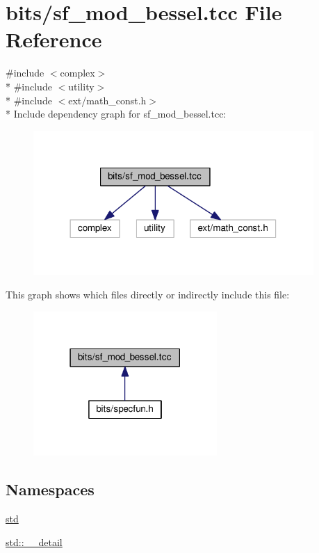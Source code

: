 \hypertarget{sf__mod__bessel_8tcc}{}\section{bits/sf\+\_\+mod\+\_\+bessel.tcc File Reference}
\label{sf__mod__bessel_8tcc}
{\ttfamily \#include $<$complex$>$}\\*
{\ttfamily \#include $<$utility$>$}\\*
{\ttfamily \#include $<$ext/math\+\_\+const.\+h$>$}\\*
Include dependency graph for sf\+\_\+mod\+\_\+bessel.\+tcc\+:
\nopagebreak
\begin{figure}[H]
\begin{center}
\leavevmode
\includegraphics[width=302pt]{sf__mod__bessel_8tcc__incl}
\end{center}
\end{figure}
This graph shows which files directly or indirectly include this file\+:
\nopagebreak
\begin{figure}[H]
\begin{center}
\leavevmode
\includegraphics[width=198pt]{sf__mod__bessel_8tcc__dep__incl}
\end{center}
\end{figure}
\subsection*{Namespaces}
\begin{DoxyCompactItemize}
\item 
 \hyperlink{namespacestd}{std}
\item 
 \hyperlink{namespacestd_1_1____detail}{std\+::\+\_\+\+\_\+detail}
\end{DoxyCompactItemize}
